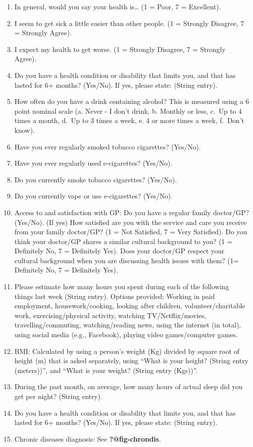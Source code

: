 \documentclass[
]{interact}
\providecommand{\tightlist}{%
  \setlength{\itemsep}{0pt}\setlength{\parskip}{0pt}}\usepackage{longtable,booktabs,array}
\begin{document}
\begin{enumerate}
\def\labelenumi{\arabic{enumi}.}
\tightlist
\item
  In general, would you say your health is\ldots{} (1 = Poor, 7 =
  Excellent).
\item
  I seem to get sick a little easier than other people. (1 = Strongly
  Disagree, 7 = Strongly Agree).
\item
  I expect my health to get worse. (1 = Strongly Disagree, 7 = Strongly
  Agree).
\item
  Do you have a health condition or disability that limits you, and that
  has lasted for 6+ months? (Yes/No). If yes, please state: (String
  entry).
\item
  How often do you have a drink containing alcohol? This is measured
  using a 6 point nominal scale (a. Never - I don't drink, b. Monthly or
  less, c.~Up to 4 times a month, d.~Up to 3 times a week, e. 4 or more
  times a week, f.~Don't know).
\item
  Have you ever regularly smoked tobacco cigarettes? (Yes/No).
\item
  Have you ever regularly used e-cigarettes? (Yes/No).
\item
  Do you currently smoke tobacco cigarettes? (Yes/No).
\item
  Do you currently vape or use e-cigarettes? (Yes/No).
\item
  Access to and satisfaction with GP: Do you have a regular family
  doctor/GP? (Yes/No). (If yes) How satisfied are you with the service
  and care you receive from your family doctor/GP? (1 = Not Satisfied, 7
  = Very Satisfied). Do you think your doctor/GP shares a similar
  cultural background to you? (1 = Definitely No, 7 = Definitely Yes).
  Does your doctor/GP respect your cultural background when you are
  discussing health issues with them? (1= Definitely No, 7 = Definitely
  Yes).
\item
  Please estimate how many hours you spent during each of the following
  things last week (String entry). Options provided: Working in paid
  employment, housework/cooking, looking after children,
  volunteer/charitable work, exercising/physical activity, watching
  TV/Netflix/movies, travelling/commuting, watching/reading news, using
  the internet (in total), using social media (e.g., Facebook), playing
  video games/computer games.
\item
  BMI: Calculated by using a person's weight (Kg) divided by square root
  of height (m) that is asked separately, using ``What is your height?
  (String entry (meters))'', and ``What is your weight? (String entry
  (Kgs))''.
\item
  During the past month, on average, how many hours of actual sleep did
  you get per night? (String entry).
\item
  Do you have a health condition or disability that limits you, and that
  has lasted for 6+ months? (Yes/No). If yes, please state: (String
  entry).
\item
  Chronic diseases diagnosis: See \textbf{?@fig-chrondis}.
\end{enumerate}
\end{document}
